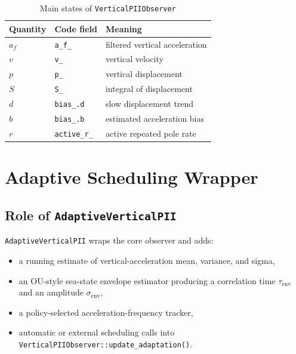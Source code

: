 \documentclass[conference]{IEEEtran}
\begin{document}
    \begin{table}[t]
        \centering
        \caption{Main states of \texttt{VerticalPIIObserver}}
        \label{tab:pii_states}
        \small
        \begin{tabular}{@{}lll@{}}
            \toprule
            Quantity & Code field & Meaning \\
            \midrule
            \(a_f\) & \texttt{a\_f\_} & filtered vertical acceleration \\
            \(v\)   & \texttt{v\_}    & vertical velocity \\
            \(p\)   & \texttt{p\_}    & vertical displacement \\
            \(S\)   & \texttt{S\_}    & integral of displacement \\
            \(d\)   & \texttt{bias\_.d} & slow displacement trend \\
            \(b\)   & \texttt{bias\_.b} & estimated acceleration bias \\
            \(r\)   & \texttt{active\_r\_} & active repeated pole rate \\
            \bottomrule
        \end{tabular}
    \end{table}

    \section{Adaptive Scheduling Wrapper}\label{sec:adaptive}

    \subsection{Role of \texttt{AdaptiveVerticalPII}}

    \texttt{AdaptiveVerticalPII} wraps the core observer and adds:
    \begin{itemize}[leftmargin=1.4em]
        \item a running estimate of vertical-acceleration mean, variance, and sigma,
        \item an OU-style sea-state envelope estimator producing a correlation
        time \(\tau_{\mathrm{env}}\) and an amplitude \(\sigma_{\mathrm{env}}\),
        \item a policy-selected acceleration-frequency tracker,
        \item automatic or external scheduling calls into
        \texttt{VerticalPIIObserver::update\_adaptation()}.
    \end{itemize}
\end{document}
